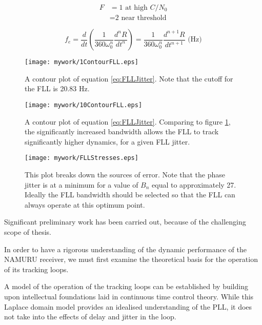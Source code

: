 \begin{align*}
F &= \text{1 at high } C/N_0\\
  &= \text{2 near threshold}
\end{align*}


\begin{equation}
f_e = \frac{d}{dt}(\frac{1}{360 \omega^n_0}\frac{d^nR}{dt^n}) = \frac{1}{360\omega^n_0} \frac{d^{n+1}R}{dt^{n+1}} \text{ (Hz)}
\end{equation}


\begin{figure}[!htb] 
    \centering
    \texttt{[image: mywork/1ContourFLL.eps]} 
    \caption{A contour plot of equation \ref{eq:FLLJitter}. Note that the cutoff for the FLL is 20.83 Hz. }
\label{fig:FLLContour1}
\end{figure}

\begin{figure}[!htb] 
    \centering
    \texttt{[image: mywork/10ContourFLL.eps]} 
    \caption{A contour plot of equation \ref{eq:FLLJitter}. Comparing to figure \ref{fig:FLLContour1}, the significantly increased bandwidth allows the FLL to track significantly higher dynamics, for a given FLL jitter.}
\end{figure}



\begin{figure}[!htb] 
    \centering
    \texttt{[image: mywork/FLLStresses.eps]} 
    \caption{This plot breaks down the sources of error. Note that the phase jitter is at a minimum for a value of $B_n$ equal to approximately 27. Ideally the FLL bandwidth should be selected so that the FLL can always operate at this optimum point.}
\end{figure}



Significant preliminary work has been carried out, because of the challenging scope of thesis. 

In order to have a rigorous understanding of the dynamic performance of the \ac{NAMURU} receiver, we must first examine the theoretical basis for the operation of its tracking loops. 

A model of the operation of the tracking loops can be established by building upon intellectual foundations laid in continuous time control theory. While this Laplace domain model provides an idealised understanding of the \ac{PLL}, it does not take into the effects of delay and jitter in the loop. 

